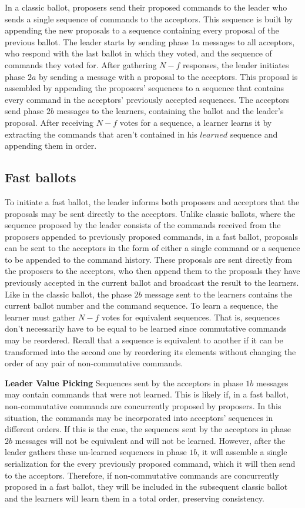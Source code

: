 In a classic ballot, proposers send their proposed commands to the leader who sends a single sequence of commands to the acceptors. This sequence is built by appending the new proposals to a sequence containing every proposal of the previous ballot. The leader starts by sending phase $1a$ messages to all acceptors, who respond with the last ballot in which they voted, and the sequence of commands they voted for. After gathering $N-f$ responses, the leader initiates phase $2a$ by sending a message with a proposal to the acceptors. This proposal is assembled by appending the proposers' sequences to a sequence that contains every command in the acceptors' previously accepted sequences. The acceptors send phase $2b$ messages to the learners, containing the ballot and the leader's proposal. After receiving $N-f$ votes for a sequence, a learner learns it by extracting the commands that aren't contained in his $learned$ sequence and appending them in order.

\subsection{Fast ballots} 
To initiate a fast ballot, the leader informs both proposers and acceptors that the proposals may be sent directly to the acceptors. Unlike classic ballots, where the sequence proposed by the leader consists of the commands received from the proposers appended to previously proposed commands, in a fast ballot, proposals can be sent to the acceptors in the form of either a single command or a sequence to be appended to the command history. These proposals are sent directly from the proposers to the acceptors, who then append them to the proposals they have previously accepted in the current ballot and broadcast the result to the learners. Like in the classic ballot, the phase $2b$ message sent to the learners contains the current ballot number and the command sequence. To learn a sequence, the learner must gather $N-f$ votes for equivalent sequences. That is, sequences don't necessarily have to be equal to be learned since commutative commands may be reordered. Recall that a sequence is equivalent to another if it can be transformed into the second one by reordering its elements without changing the order of any pair of non-commutative commands. \par
\textbf{Leader Value Picking} Sequences sent by the acceptors in phase $1b$ messages may contain commands that were not learned. This is likely if, in a fast ballot, non-commutative commands are  concurrently proposed by proposers. In this situation, the commands may be incorporated into acceptors' sequences in different orders. If this is the case, the sequences sent by the acceptors in phase $2b$ messages will not be equivalent and will not be learned. However, after the leader gathers these un-learned sequences in phase $1b$, it will assemble a single serialization for the every previously proposed command, which it will then send to the acceptors. Therefore, if non-commutative commands are concurrently proposed in a fast ballot, they will be included in the subsequent classic ballot and the learners will learn them in a total order, preserving consistency.
